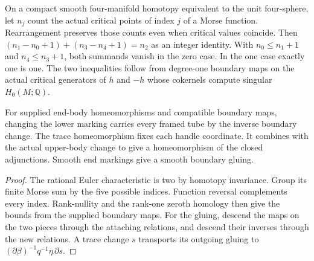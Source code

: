 \begin{proposition}
\label{prop:ed03-end-counts}
\leanok
On a compact smooth four-manifold homotopy equivalent to the unit
four-sphere, let $n_j$ count the actual critical points of index $j$
of a Morse function. Rearrangement preserves those counts even when
critical values coincide. Then
$(n_1-n_0+1)+(n_3-n_4+1)=n_2$ as an integer identity. With
$n_0\le n_1+1$ and $n_4\le n_3+1$, both summands vanish in the
zero case. In the one case exactly one is one. The two inequalities
follow from degree-one boundary maps on the actual critical generators
of $h$ and $-h$ whose cokernels compute singular $H_0(M;\mathbb Q)$.

For supplied end-body homeomorphisms and compatible boundary maps,
changing the lower marking carries every framed tube by the inverse
boundary change. The trace homeomorphism fixes each handle coordinate.
It combines with the actual upper-body change to give a homeomorphism
of the closed adjunctions. Smooth end markings give a smooth boundary
gluing.
\end{proposition}
\begin{proof}
\leanok
The rational Euler characteristic is two by homotopy invariance.
Group its finite Morse sum by the five possible indices. Function
reversal complements every index. Rank-nullity and the rank-one
zeroth homology then give the bounds from the supplied boundary maps. For the
gluing, descend the maps on the two pieces through the attaching
relations, and descend their inverses through the new relations.
A trace change $s$ transports its outgoing gluing to
$(\partial\beta)^{-1}q^{-1}\eta\,\partial s$.
\end{proof}


